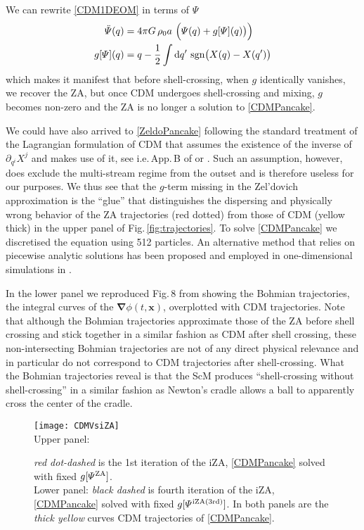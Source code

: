 \documentclass[twocolumn, nofootinbib, showpacs, superscriptaddress]{revtex4-1}
\newcommand{\NEW}[1]{#1}
\renewcommand{\d}[0]{{\rm{d}}}
\newcommand{\vx}[0]{\bm{x} }
\newcommand{\vnabla}[0]{\bm{\nabla} }
\begin{document}
%
 We can rewrite \eqref{CDM1DEOM} in terms of $\varPsi$ 
   \begin{align} \label{CDMPancake}
 \ddot \varPsi(q)  &=  4 \pi G\,\rho_0 a\ \Big(\varPsi(q)  + g[\varPsi](q) \big) \Big) \\
 g[\varPsi](q) & = q- \frac{1}{2}\int \d q'\,\,  \mathrm{sgn}\big(X(q) - X(q') \big) \notag
 \end{align}
 which makes it manifest that before shell-crossing, when  $g$ identically vanishes,  we recover the ZA,
 but once CDM undergoes shell-crossing and mixing, $g$ becomes non-zero and the ZA is no longer a solution  to \eqref{CDMPancake}. 
 
 We could have also arrived to \eqref{ZeldoPancake}  following the standard treatment of the Lagrangian formulation of CDM that assumes the existence of the inverse of $\partial_{q^i} X^j$ and makes use of it, see i.e.\,App.\,B of \cite{UhlemannKoppHaugg2014} or \cite{Buchert1996}. 
Such an assumption, however, does exclude the multi-stream regime from the outset 
and is therefore useless for our purposes. We thus see that the $g$-term missing  in the Zel'dovich approximation is the ``glue'' 
that distinguishes the dispersing and physically wrong behavior of the ZA trajectories (red dotted) from those of 
CDM (yellow thick) in the upper panel of Fig.\,\ref{fig:trajectories}.
\NEW{To solve \eqref{CDMPancake} we discretised the equation using 512 particles. An alternative method that relies on piecewise analytic solutions has been proposed and employed in one-dimensional simulations in \cite{GoudaNakamura1989,YanoGouda1998,TatekawaMaeda2001}.}

 In the lower panel we reproduced Fig.\,8 from \cite{UhlemannKoppHaugg2014} showing the Bohmian trajectories, the integral curves
 of the $\vnabla \phi(t,\vx)$, overplotted with CDM trajectories.
Note that although the Bohmian trajectories approximate those of the ZA 
before shell crossing and stick together in a similar fashion as CDM after shell crossing, 
these non-intersecting Bohmian trajectories are not of any direct physical relevance and in 
particular do not correspond to CDM trajectories after shell-crossing.
What the Bohmian trajectories reveal is that the ScM produces ``shell-crossing without shell-crossing'' in a similar fashion as Newton's cradle allows a ball to apparently cross the center of the cradle.
%
\begin{figure}[t]
\texttt{[image: CDMVsiZA]}\\
Upper panel: \caption{\textit{red dot-dashed} is the 1st iteration of the  iZA, \eqref{CDMPancake} solved with fixed $g[\varPsi^{\rm ZA}]$. 
 \\ Lower panel: \textit{black dashed} is fourth iteration of the iZA, \eqref{CDMPancake} solved with fixed $g[\varPsi^{\rm iZA (3rd)}]$. In both panels are the \textit{thick yellow} 
curves CDM trajectories of  \eqref{CDMPancake}. }
\label{fig:iZA}
\end{figure}
%
\end{document}
